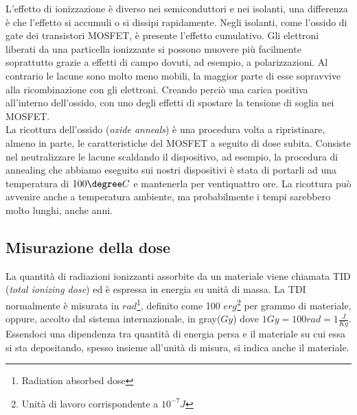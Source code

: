 L'effetto di ionizzazione è diverso nei semiconduttori e nei isolanti, una differenza è che l'effetto si accumuli o si dissipi rapidamente.
Negli isolanti, come l'ossido di gate dei transistori MOSFET, è presente l'effetto cumulativo. Gli elettroni liberati da una particella ionizzante si possono muovere più facilmente soprattutto grazie a effetti di campo dovuti, ad esempio, a polarizzazioni.
Al contrario le lacune sono molto meno mobili, la maggior parte di esse sopravvive alla ricombinazione con gli elettroni. Creando perciò una carica positiva all'interno dell'ossido, con uno degli effetti di spostare la tensione di soglia nei MOSFET.
\\
La ricottura dell'ossido (\textit{oxide anneals}) è una procedura volta a ripristinare, almeno in parte, le caratteristiche del MOSFET a seguito di dose subita.
Consiste nel neutralizzare le lacune scaldando il dispositivo, ad esempio, la procedura di annealing che abbiamo eseguito sui nostri dispositivi è stata di portarli ad una temperatura di $100\degree C$ e mantenerla per ventiquattro ore. La ricottura può avvenire anche a temperatura ambiente, ma probabilmente i tempi sarebbero molto lunghi, anche anni\cite{bib:Effetti_Radiazioni_NASA}. 

\subsection{Misurazione della dose}
La quantità di radiazioni ionizzanti assorbite da un materiale viene chiamata TID (\textit{total ionizing dose}) ed è espressa in energia su unità di massa.
La TDI normalmente è misurata in $rad$\footnote{Radiation absorbed dose}, definito come 100 $erg$\footnote{Unità di lavoro corrispondente a $10^{-7} J$} per grammo di materiale, oppure, accolto dal sistema internazionale, in gray($Gy$) dove $1 Gy = 100rad = 1\frac{J}{Kg}$.
Essendoci una dipendenza tra quantità di energia persa e il materiale su cui essa si sta depositando, spesso insieme all'unità di misura, si indica anche il materiale. 




